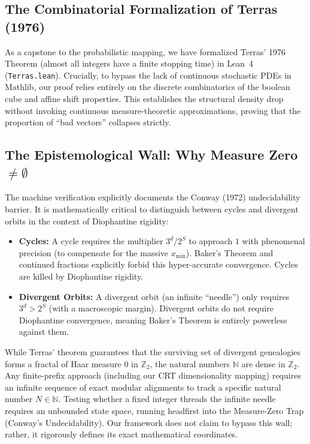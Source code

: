 \documentclass[12pt,a4paper]{article}
\theoremstyle{remark}
\begin{document}
\subsection{The Combinatorial Formalization of Terras (1976)}
As a capstone to the probabilistic mapping, we have formalized Terras' 1976 Theorem (almost all integers have a finite stopping time) in Lean~4 (\texttt{Terras.lean}). Crucially, to bypass the lack of continuous stochastic PDEs in Mathlib, our proof relies entirely on the discrete combinatorics of the boolean cube and affine shift properties. This establishes the structural density drop without invoking continuous measure-theoretic approximations, proving that the proportion of ``bad vectors'' collapses strictly.

\subsection{The Epistemological Wall: Why Measure Zero $\neq \emptyset$}
The machine verification explicitly documents the Conway (1972) undecidability barrier. It is mathematically critical to distinguish between cycles and divergent orbits in the context of Diophantine rigidity:
\begin{itemize}
    \item \textbf{Cycles:} A cycle requires the multiplier $3^d / 2^S$ to approach $1$ with phenomenal precision (to compensate for the massive $x_{\mathrm{min}}$). Baker's Theorem and continued fractions explicitly forbid this hyper-accurate convergence. Cycles are killed by Diophantine rigidity.
    \item \textbf{Divergent Orbits:} A divergent orbit (an infinite ``needle'') only requires $3^d > 2^S$ (with a macroscopic margin). Divergent orbits do not require Diophantine convergence, meaning Baker's Theorem is entirely powerless against them.
\end{itemize}
While Terras' theorem guarantees that the surviving set of divergent genealogies forms a fractal of Haar measure $0$ in $\mathbb{Z}_2$, the natural numbers $\mathbb{N}$ are dense in $\mathbb{Z}_2$. Any finite-prefix approach (including our CRT dimensionality mapping) requires an infinite sequence of exact modular alignments to track a specific natural number $N \in \mathbb{N}$. Testing whether a fixed integer threads the infinite needle requires an unbounded state space, running headfirst into the Measure-Zero Trap (Conway's Undecidability). Our framework does not claim to bypass this wall; rather, it rigorously defines its exact mathematical coordinates.
\end{document}
